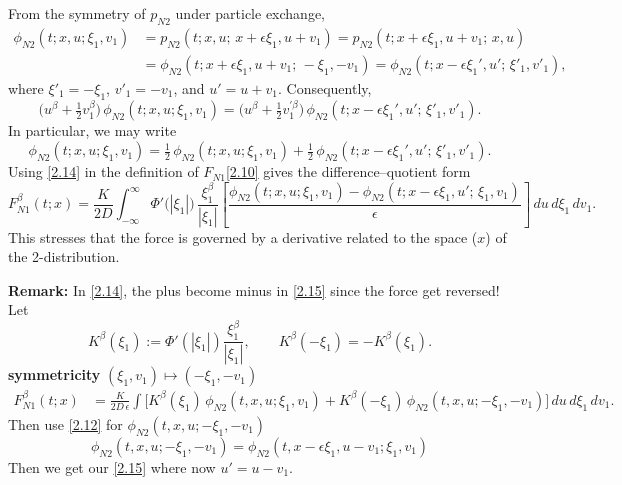 \documentclass[11pt]{article}
\begin{document}
From the symmetry of $p_{N2}$ under particle exchange,
\begin{equation*}\label{2.12}
\begin{aligned}
\phi_{N2}(t;x,u;\xi_1,v_1)
&=p_{N2}(t;x,u;\,x+\epsilon\xi_1,u+v_1)
= p_{N2}(t;x+\epsilon\xi_1,u+v_1;\,x,u)
\\
&=\phi_{N2}(t;x+\epsilon\xi_1,u+v_1;\,-\xi_1,-v_1)
=\phi_{N2}(t;x-\epsilon\xi_1',u';\,\xi'_1,v'_1),
\end{aligned}
\tag{2.12}
\end{equation*}
where $\xi'_1=-\xi_1$, $v'_1=-v_1$, and $u'=u+v_1$.
Consequently,
\begin{equation*}\label{2.13}
\big(u^\beta+\tfrac12 v_1^\beta\big)\,\phi_{N2}(t;x,u;\xi_1,v_1)
=
\big(u^\beta+\tfrac12 v_1^{\prime\beta}\big)\,\phi_{N2}(t;x-\epsilon\xi_1',u';\,\xi'_1,v'_1).
\tag{2.13}
\end{equation*}
In particular, we may write
\begin{equation*}\label{2.14}
\phi_{N2}(t;x,u;\xi_1,v_1)
=
\tfrac12\,\phi_{N2}(t;x,u;\xi_1,v_1)
+\tfrac12\,\phi_{N2}(t;x-\epsilon\xi_1',u';\,\xi'_1,v'_1).
\tag{2.14}
\end{equation*}
Using \eqref{2.14} in the definition of $F_{N1}$\eqref{2.10} gives the difference–quotient form
\begin{equation*}\label{2.15}
F_{N1}^\beta(t;x)
=
\frac{K}{2D}
\int_{-\infty}^{\infty}
\Phi'\big(|\xi_1|\big)\,\frac{\xi_1^\beta}{|\xi_1|}
\left[
\frac{\phi_{N2}(t;x,u;\xi_1,v_1)-\phi_{N2}(t;x-\epsilon\xi_1,u';\,\xi_1,v_1)}{\epsilon}
\right]\,du\,d\xi_1\,dv_1.
\tag{2.15}
\end{equation*}
This stresses that the force is governed by a derivative related to the space ($x$) of the 2-distribution.

\textbf{\textbf{Remark:}} In \eqref{2.14}, the plus become minus in \eqref{2.15} since the force get reversed! Let\[
K^\beta(\xi_1) := \Phi'(|\xi_1|)\frac{\xi_1^\beta}{|\xi_1|},
\qquad K^\beta(-\xi_1) = -K^\beta(\xi_1).
\]
\textbf{symmetricity}  
 $(\xi_1,v_1)\mapsto(-\xi_1,-v_1)$ 
\begin{equation*}
\begin{aligned}
F_{N1}^\beta(t;x)
&=\frac{K}{2D\,\epsilon}\int \Big[
K^\beta(\xi_1)\,\phi_{N2}(t,x,u;\xi_1,v_1)
+K^\beta(-\xi_1)\,\phi_{N2}(t,x,u;-\xi_1,-v_1)
\Big]\,du\,d\xi_1\,dv_1.
\end{aligned}
\end{equation*}
Then use \eqref{2.12} for $\phi_{N2}(t,x,u;-\xi_1,-v_1)$ \[
\phi_{N2}(t,x,u;-\xi_1,-v_1)=\phi_{N2}(t,x-\epsilon\xi_1,u-v_1;\xi_1,v_1)
\]
Then we get our \eqref{2.15} where now $u'=u-v_1$.
\end{document}
